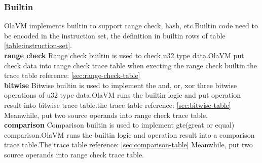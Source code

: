 \subsubsection{Builtin}\label{subsec: instructions-builtin}
OlaVM implements builtin to support range check, hash, etc.Builtin code need to be encoded in the instruction set, the definition in builtin rows of table \ref{table:instruction-set}. \\

\textbf{range check}
Range check builtin is used to check u32 type data.OlaVM put check data into range check trace table when execting the range check builtin.the trace table reference: \ref{sec:range-check-table} \\

\textbf{bitwise}
Bitwise builtin is used to implement the and, or, xor three bitwise operations of u32 type data.OlaVM runs the builtin logic and put operation result into bitwise trace table.the trace table reference: \ref{sec:bitwise-table}
Meanwhile, put two source operands into range check trace table. \\

\textbf{comparison}
Comparison builtin is used to implement gte(great or equal) comparison.OlaVM runs the builtin logic and operation result into a comparison trace table.The trace table reference: \ref{sec:comparison-table}
Meanwhile, put two source operands into range check trace table.
